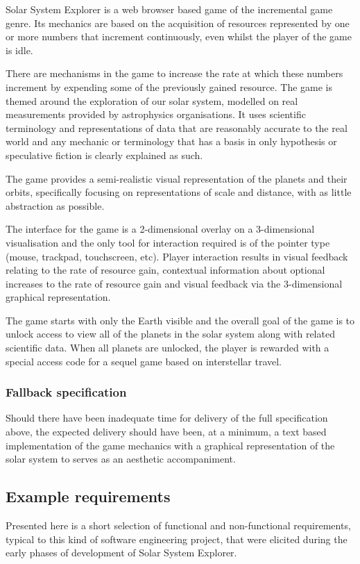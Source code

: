 \documentclass[twoside]{bhamthesis}
\begin{document}
Solar System Explorer is a web browser based game of the incremental game genre. Its mechanics are based on the acquisition of resources represented by one or more numbers that increment continuously, even whilst the player of the game is idle.

There are mechanisms in the game to increase the rate at which these numbers increment by expending some of the previously gained resource. The game is themed around the exploration of our solar system, modelled on real measurements provided by astrophysics organisations. It uses scientific terminology and representations of data that are reasonably accurate to the real world and any mechanic or terminology that has a basis in only hypothesis or speculative fiction is clearly explained as such.

The game provides a semi-realistic visual representation of the planets and their orbits, specifically focusing on representations of scale and distance, with as little abstraction as possible.

The interface for the game is a 2-dimensional overlay on a 3-dimensional visualisation and the only tool for interaction required is of the pointer type (mouse, trackpad, touchscreen, etc). Player interaction results in visual feedback relating to the rate of resource gain, contextual information about optional increases to the rate of resource gain and visual feedback via the 3-dimensional graphical representation.

The game starts with only the Earth visible and the overall goal of the game is to unlock access to view all of the planets in the solar system along with related scientific data. When all planets are unlocked, the player is rewarded with a special access code for a sequel game based on interstellar travel.

\subsubsection{Fallback specification}
Should there have been inadequate time for delivery of the full specification above, the expected delivery should have been, at a minimum, a text based implementation of the game mechanics with a graphical representation of the solar system to serves as an aesthetic accompaniment.

\subsection{Example requirements}
Presented here is a short selection of functional and non-functional requirements, typical to this kind of software engineering project, that were elicited during the early phases of development of Solar System Explorer.
\end{document}
